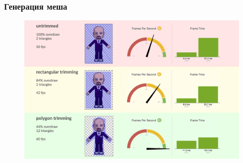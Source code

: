 \documentclass[10pt, unicode]{beamer}
\begin{document}
    \begin{frame}
        \frametitle{Генерация меша}
        \begin{figure}
            \centering
            \includegraphics[width=\linewidth, keepaspectratio]{SuperPacking.png}
        \end{figure}
    \end{frame}
    
\end{document}
